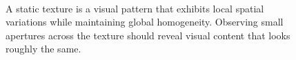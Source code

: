 \begin{figure}[t]
\begin{center}
	\\
	\caption[A static texture]{A static texture is a visual pattern that exhibits local spatial variations while maintaining global homogeneity. Observing small apertures across the texture should reveal visual content that looks roughly the same.}
	\vspace{-0.65cm}
	\label{fig:texture}
\end{center}
\end{figure}